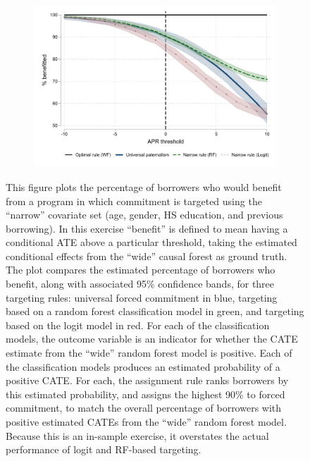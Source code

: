 \vspace{.3in}

\begin{figure}[H]
    \caption{Targeting rules}
    \label{targeting_rules}
    \begin{center}
    \begin{subfigure}{0.75\textwidth}
        \centering
        \includegraphics[width=\textwidth]{Figuras/wide_narrow_rule.pdf}
    \end{subfigure}
    \end{center}
      \scriptsize   This figure plots the percentage of borrowers who would benefit from a program in which commitment is targeted using the ``narrow'' covariate set (age, gender, HS education, and previous borrowing). In this exercise ``benefit'' is defined to mean having a conditional ATE above a particular threshold, taking the estimated conditional effects from the ``wide'' causal forest as ground truth. The plot compares the estimated percentage of borrowers who benefit, along with associated 95\% confidence bands, for three targeting rules: universal forced commitment in blue, targeting based on a random forest classification model in green, and targeting based on the logit model in red. For each of the classification models, the outcome variable is an indicator for whether the CATE estimate from the ``wide'' random forest model is positive. Each of the classification models produces an estimated probability of a positive CATE. For each, the assignment rule ranks borrowers by this estimated probability, and assigns the highest 90\% to forced commitment, to match the overall percentage of borrowers with positive estimated CATEs from the ``wide'' random forest model. Because this is an in-sample exercise, it overstates the actual performance of logit and RF-based targeting. 


\end{figure}
